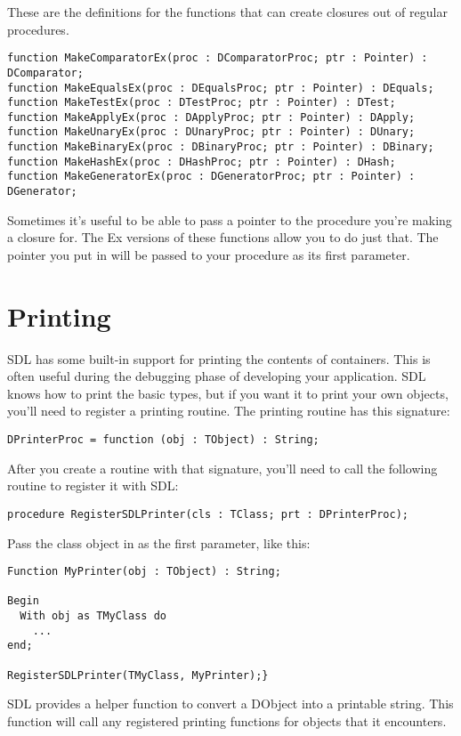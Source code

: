 \documentclass{report}
\begin{document}
These are the definitions for the functions that can 
create closures out of regular procedures.

\begin{lstlisting}
function MakeComparatorEx(proc : DComparatorProc; ptr : Pointer) : DComparator;
function MakeEqualsEx(proc : DEqualsProc; ptr : Pointer) : DEquals;
function MakeTestEx(proc : DTestProc; ptr : Pointer) : DTest;
function MakeApplyEx(proc : DApplyProc; ptr : Pointer) : DApply;
function MakeUnaryEx(proc : DUnaryProc; ptr : Pointer) : DUnary;
function MakeBinaryEx(proc : DBinaryProc; ptr : Pointer) : DBinary;
function MakeHashEx(proc : DHashProc; ptr : Pointer) : DHash;
function MakeGeneratorEx(proc : DGeneratorProc; ptr : Pointer) : DGenerator;
\end{lstlisting}

Sometimes it's useful to be able to pass a pointer to the procedure you're
making a closure for. The Ex versions of these functions allow you to do
just that. The pointer you put in will be passed to your procedure as its
first parameter.

\section{Printing}

SDL has some built-in support for printing the contents of containers. This
is often useful during the debugging phase of developing your application. 
SDL knows how to print the basic types, but if you want it to print your own
objects, you'll need to register a printing routine. The printing routine
has this signature:

\lstinline|DPrinterProc = function (obj : TObject) : String;|

After you create a routine with that signature, you'll 
need to call the following routine to register it with SDL:

\lstinline|procedure RegisterSDLPrinter(cls : TClass; prt : DPrinterProc);|

Pass the class object in as the first parameter, like 
this:

\begin{lstlisting}
Function MyPrinter(obj : TObject) : String;

Begin
  With obj as TMyClass do
    ...
end;

RegisterSDLPrinter(TMyClass, MyPrinter);}

\end{lstlisting}

SDL provides a helper function to convert a DObject into a printable string.
This function will call any registered printing functions for objects that
it encounters.
\end{document}
